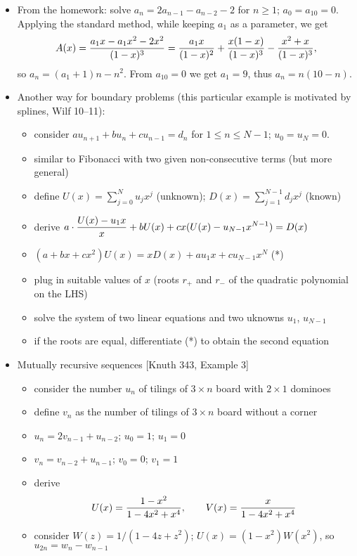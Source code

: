 \documentclass[10pt, a4paper]{article}
\begin{document}
\begin{itemize}

\item From the homework: solve $a_n = 2a_{n-1}-a_{n-2}-2$ for $n\ge 1$; $a_0=a_{10}=0$.\\
Applying the standard method, while keeping $a_1$ as a parameter, we get
$$
A(x)={a_1x-a_1x^2-2x^2\over (1-x)^3}={a_1x\over (1-x)^2}+{x(1-x)\over (1-x)^3}-{x^2+x\over (1-x)^3},
$$
so $a_n=(a_1+1)n-n^2$. From $a_{10}=0$ we get $a_1=9$, thus $a_n=n(10-n)$.

\item 
Another way for boundary problems (this particular example is motivated by splines, Wilf 10--11):
\begin{itemize}
    \item consider $au_{n+1}+bu_n+cu_{n-1}=d_n$ for $1\le n\le N-1$; $u_0=u_N=0$.
    \item similar to Fibonacci with two given non-consecutive terms (but more general)
    \item define $U(x)= \sum_{j=0}^N u_jx^j$ (unknown); $D(x)=\sum_{j=1}^{N-1} d_jx^j$ (known)
    \item derive $\displaystyle a\cdot {U(x)-u_1x\over x}+bU(x)+cx(U(x)-u_{N-1}x^{N-1}) = D(x)$
    \item $(a+bx+cx^2) U(x) = x D(x)  +au_1x + cu_{N-1}x^N$ (*)
    \item plug in suitable values of $x$ (roots $r_{+}$ and $r_{-}$ of the quadratic polynomial on the LHS)
    \item solve the system of two linear equations and two uknowns $u_1$, $u_{N-1}$
    \item if the roots are equal, differentiate (*) to obtain the second equation
\end{itemize}

\item
Mutually recursive sequences [Knuth 343, Example 3]

\begin{itemize}
    \item consider the number $u_n$ of tilings of $3\times n$ board with $2\times 1$ dominoes
    \item define $v_n$ as the number of tilings of $3\times n$ board without a corner
    \item $u_n = 2v_{n-1} + u_{n-2}$; \quad $u_0 = 1$; $u_1 = 0$
    \item $v_n = v_{n-2} + u_{n-1}$; \quad $v_0 = 0$; $v_1 = 1$
    \item derive $$U(x) = {1-x^2\over 1-4x^2+x^4},\qquad V(x) = {x\over 1-4x^2+x^4}$$
    \item consider $W(z) = 1/(1-4z+z^2)$; $U(x) = (1-x^2)W(x^2)$, so $u_{2n} = w_n - w_{n-1}$


\end{itemize}
\end{itemize}
\end{document}
